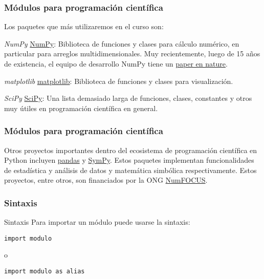 \documentclass{beamer}
\begin{document}
\begin{frame}[fragile]
\frametitle{Módulos para programación científica}
Los paquetes que más utilizaremos en el curso son:
\begin{block}{{\em NumPy}}
\href{https://numpy.org/}{NumPy}:
Biblioteca de funciones y clases para cálculo numérico, en particular para arreglos multidimensionales. Muy recientemente, luego de 15 años de existencia, el equipo de desarrollo NumPy tiene un \href{https://www.nature.com/articles/s41586-020-2649-2}{paper en nature}.
\end{block}
\begin{block}{{\em matplotlib}}
\href{https://matplotlib.org}{matplotlib}:
Biblioteca de funciones y clases para visualización.
\end{block}
\begin{block}{{\em SciPy}}
\href{https://scipy.org}{SciPy}:
Una lista demasiado larga de funciones, clases, constantes y otros muy útiles en programación científica en general.
\end{block}
\end{frame}

\begin{frame}[fragile]
\frametitle{Módulos para programación científica}
Otros proyectos importantes dentro del ecosistema de programación científica en Python incluyen \href{https://pandas.pydata.org/}{pandas} y \href{https://www.sympy.org/en/index.html}{SymPy}. Estos paquetes implementan funcionalidades de estadística y análisis de datos y matemática simbólica respectivamente. Estos proyectos, entre otros, son financiados por la ONG \href{https://numfocus.org/sponsored-projects}{NumFOCUS}.

\end{frame}

\begin{frame}[fragile]
\frametitle{Sintaxis}
\begin{block}{Sintaxis}
Para importar un módulo puede usarse la sintaxis:
\begin{verbatim}
import modulo 
\end{verbatim}
o
\begin{verbatim}
import modulo as alias
\end{verbatim}
\end{block}
\end{frame}
\end{document}
